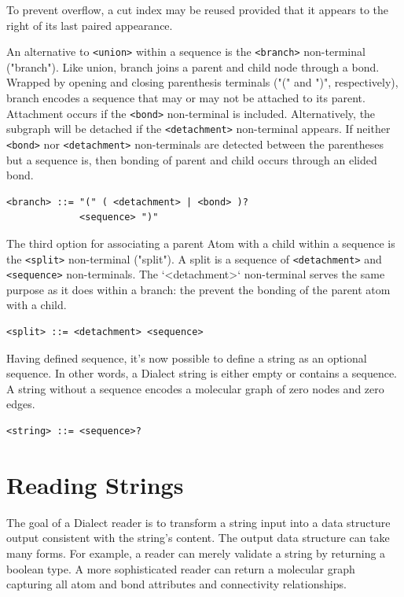 \documentclass{article}
\def\ttt{\texttt}
\begin{document}
To prevent overflow, a cut index may be reused provided that it appears to the right of its last paired appearance.

An alternative to \ttt{<union>} within a sequence is the \ttt{<branch>} non-terminal ("branch"). Like union, branch joins a parent and child node through a bond. Wrapped by opening and closing parenthesis terminals ("(" and ")", respectively), branch encodes a sequence that may or may not be attached to its parent. Attachment occurs if the \ttt{<bond>} non-terminal is included. Alternatively, the subgraph will be detached if the \ttt{<detachment>} non-terminal appears. If neither \ttt{<bond>} nor \ttt{<detachment>} non-terminals are detected between the parentheses but a sequence is, then bonding of parent and child occurs through an elided bond.

\begin{lstlisting}
<branch> ::= "(" ( <detachment> | <bond> )?
             <sequence> ")"
\end{lstlisting}

The third option for associating a parent Atom with a child within a sequence is the \ttt{<split>} non-terminal ("split"). A split is a sequence of \ttt{<detachment>} and \ttt{<sequence>} non-terminals. The `<detachment>` non-terminal serves the same purpose as it does within a branch: the prevent the bonding of the parent atom with a child.

\begin{lstlisting}
<split> ::= <detachment> <sequence>
\end{lstlisting}

Having defined sequence, it's now possible to define a string as an optional sequence. In other words, a Dialect string is either empty or contains a sequence. A string without a sequence encodes a molecular graph of zero nodes and zero edges.

\begin{lstlisting}
<string> ::= <sequence>?
\end{lstlisting}

\section*{Reading Strings}

The goal of a Dialect reader is to transform a string input into a data structure output consistent with the string's content. The output data structure can take many forms. For example, a reader can merely validate a string by returning a boolean type. A more sophisticated reader can return a molecular graph capturing all atom and bond attributes and connectivity relationships.
\end{document}
